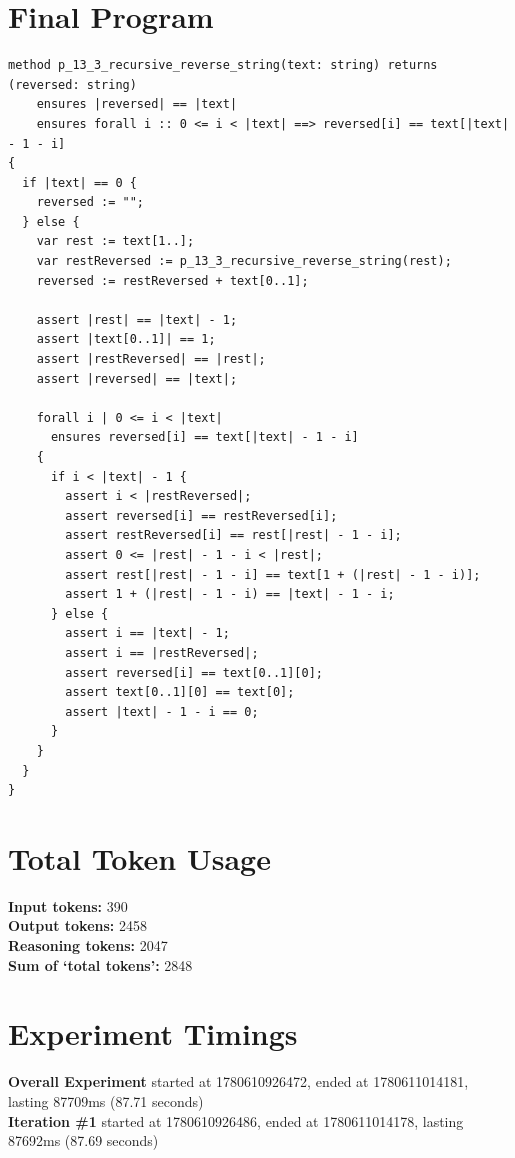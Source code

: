 \documentclass{article}
\begin{document}
\section*{Final Program}
\begin{lstlisting}
method p_13_3_recursive_reverse_string(text: string) returns (reversed: string)
	ensures |reversed| == |text|
	ensures forall i :: 0 <= i < |text| ==> reversed[i] == text[|text| - 1 - i]
{
  if |text| == 0 {
    reversed := "";
  } else {
    var rest := text[1..];
    var restReversed := p_13_3_recursive_reverse_string(rest);
    reversed := restReversed + text[0..1];

    assert |rest| == |text| - 1;
    assert |text[0..1]| == 1;
    assert |restReversed| == |rest|;
    assert |reversed| == |text|;

    forall i | 0 <= i < |text|
      ensures reversed[i] == text[|text| - 1 - i]
    {
      if i < |text| - 1 {
        assert i < |restReversed|;
        assert reversed[i] == restReversed[i];
        assert restReversed[i] == rest[|rest| - 1 - i];
        assert 0 <= |rest| - 1 - i < |rest|;
        assert rest[|rest| - 1 - i] == text[1 + (|rest| - 1 - i)];
        assert 1 + (|rest| - 1 - i) == |text| - 1 - i;
      } else {
        assert i == |text| - 1;
        assert i == |restReversed|;
        assert reversed[i] == text[0..1][0];
        assert text[0..1][0] == text[0];
        assert |text| - 1 - i == 0;
      }
    }
  }
}
\end{lstlisting}
\section*{Total Token Usage}
\textbf{Input tokens: }390
\\\textbf{Output tokens: }2458
\\\textbf{Reasoning tokens: }2047
\\\textbf{Sum of `total tokens': }2848
\section*{Experiment Timings}
\textbf{Overall Experiment} started at 1780610926472, ended at 1780611014181, lasting 87709ms (87.71 seconds)
\\\textbf{Iteration \#1} started at 1780610926486, ended at 1780611014178, lasting 87692ms (87.69 seconds)
\end{document}
